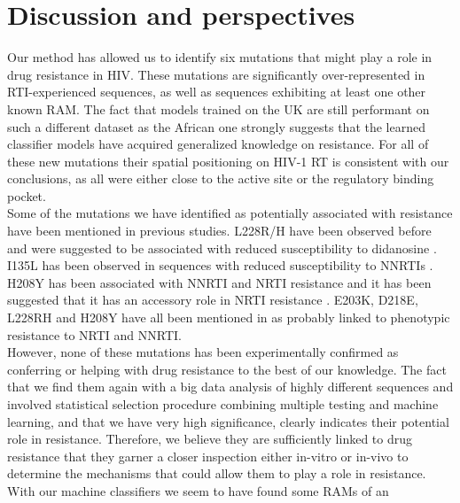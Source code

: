 \documentclass[
  11pt,
  twoside]{scrbook}
\begin{document}
\hypertarget{discussion-and-perspectives}{%
\section{Discussion and perspectives}\label{discussion-and-perspectives}}

Our method has allowed us to identify six mutations that might play a
role in drug resistance in HIV. These mutations are significantly
over-represented in RTI-experienced sequences, as well as sequences
exhibiting at least one other known RAM. The fact that models trained on
the UK are still performant on such a different dataset as the African
one strongly suggests that the learned classifier models have acquired
generalized knowledge on resistance. For all of these new mutations
their spatial positioning on HIV-1 RT is consistent with our
conclusions, as all were either close to the active site or the
regulatory binding pocket.\\
Some of the mutations we have identified as potentially associated with
resistance have been mentioned in previous studies. L228R/H have been
observed before \autocite{rheeHIV1SubtypeProtease2007} and were suggested to be
associated with reduced susceptibility to didanosine
\autocite{delucaImprovedInterpretationGenotypic2007,marcelinImpactHIV1Reverse2006}.
I135L has been observed in sequences with reduced susceptibility to
NNRTIs \autocite{brownReducedSusceptibilityHuman2000}. H208Y has been associated
with NNRTI and NRTI resistance \autocite{clarkReverseTranscriptaseMutations2006}
and it has been suggested that it has an accessory role in NRTI
resistance \autocite{nebbiaEmergenceH208YMutation2007}. E203K, D218E, L228RH and
H208Y have all been mentioned in \autocite{saracinoImpactUnreportedHIV12006} as
probably linked to phenotypic resistance to NRTI and NNRTI.\\
However, none of these mutations has been experimentally confirmed as
conferring or helping with drug resistance to the best of our knowledge.
The fact that we find them again with a big data analysis of highly
different sequences and involved statistical selection procedure
combining multiple testing and machine learning, and that we have very
high significance, clearly indicates their potential role in resistance.
Therefore, we believe they are sufficiently linked to drug resistance
that they garner a closer inspection either in-vitro or in-vivo to
determine the mechanisms that could allow them to play a role in
resistance.\\
With our machine classifiers we seem to have found some RAMs of an
\end{document}
